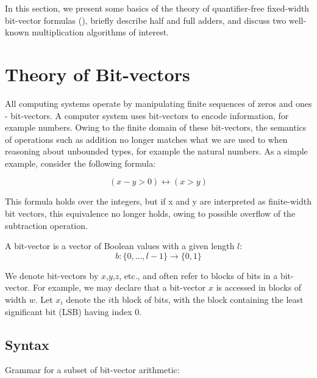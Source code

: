 In this section, we present some basics of the theory of
quantifier-free fixed-width bit-vector formulas (\qfbv), briefly describe half and full adders, and discuss
two well-known multiplication algorithms of interest.

%

\section{Theory of Bit-vectors}

All computing systems operate by manipulating finite sequences of zeros and ones - bit-vectors. A computer system uses
bit-vectors to encode information, for example numbers. Owing to the finite
domain of these bit-vectors, the semantics of operations such as addition no
longer matches what we are used to when reasoning about unbounded types,
for example the natural numbers. As a simple example, consider the following formula:

\[( x-y > 0) \leftrightarrow (x > y)
\]

\noindent This formula holds over the integers, but if x and y are interpreted as finite-width bit vectors, this equivalence
no longer holds, owing to possible overflow of the subtraction operation.

A bit-vector is a vector of Boolean values with a given length $l$:
\[
b:\{0,. . .,l-1\} \rightarrow \{0,1\}
\]

%
\noindent We denote bit-vectors by $x$,$y$,$z$, etc., and often
%
refer to blocks of bits in a bit-vector.
%
For example, we may declare that a bit-vector $x$ is accessed in
blocks of width $w$.
%
Let $x_i$ denote the $i$th block of bits, with the block containing
the least significant bit (LSB) having index $0$.
%

\subsection{Syntax}


Grammar for a subset of bit-vector arithmetic:

